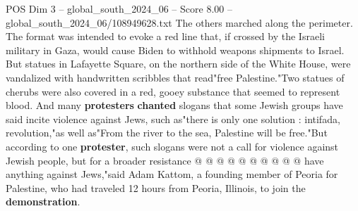 \begin{textsample}{POS Dim 3 – global\_south\_2024\_06 – Score 8.00 – global\_south\_2024\_06/108949628.txt}
The others marched along the perimeter.
The format was intended to evoke a red line that, if crossed by the Israeli military in Gaza, would cause Biden to withhold weapons shipments to Israel.
But statues in Lafayette Square, on the northern side of the White House, were vandalized with handwritten scribbles that read"free Palestine."Two statues of cherubs were also covered in a red, gooey substance that seemed to represent blood.
And many \textbf{protesters} \textbf{chanted} slogans that some Jewish groups have said incite violence against Jews, such as"there is only one solution : intifada, revolution,"as well as"From the river to the sea, Palestine will be free."But according to one \textbf{protester}, such slogans were not a call for violence against Jewish people, but for a broader resistance @ @ @ @ @ @ @ @ @ @ have anything against Jews,"said Adam Kattom, a founding member of Peoria for Palestine, who had traveled 12 hours from Peoria, Illinois, to join the \textbf{demonstration}.

\end{textsample}
